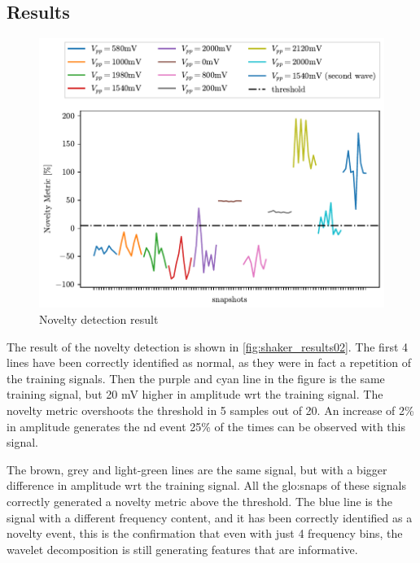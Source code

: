 \subsection{Results}
\begin{figure}
    \centering
    \includegraphics{Images/shaker/Test02.pdf}
    \caption{Novelty detection result}
    \label{fig:shaker_results02}
\end{figure}
The result of the novelty detection is shown in \autoref{fig:shaker_results02}. The first 4 lines have been correctly identified as normal, as they were in fact a repetition of the training signals.
Then the purple and cyan line in the figure is the same training signal, but 20 mV higher in amplitude \gls{wrt} the training signal. The novelty metric overshoots the threshold in 5 samples out of 20. An increase of 2\% in amplitude generates the \gls{nd} event 25\% of the times can be observed with this signal. 

The brown, grey and light-green lines are the same signal, but with a bigger difference in amplitude \gls{wrt} the training signal. All the \gls{glo:snap}s of these signals correctly generated a novelty metric above the threshold. The blue line is the signal with a different frequency content, and it has been correctly identified as a novelty event, this is the confirmation that even with just 4 frequency bins, the wavelet decomposition is still generating features that are informative.

